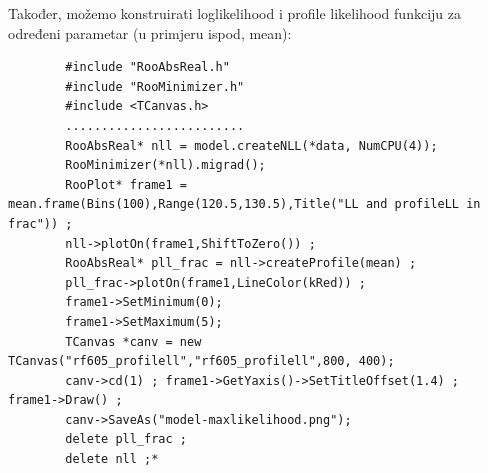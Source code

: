 \documentclass[12pt,a4paper,oneside]{article}
\begin{document}
\begin{linenumbers}
		
		Također, možemo konstruirati loglikelihood i profile likelihood funkciju za određeni parametar (u primjeru ispod, mean):
		
		\begin{verbatim}
		#include "RooAbsReal.h"
		#include "RooMinimizer.h"
		#include <TCanvas.h>
		.........................
		RooAbsReal* nll = model.createNLL(*data, NumCPU(4));
		RooMinimizer(*nll).migrad();
		RooPlot* frame1 = mean.frame(Bins(100),Range(120.5,130.5),Title("LL and profileLL in frac")) ;
		nll->plotOn(frame1,ShiftToZero()) ;
		RooAbsReal* pll_frac = nll->createProfile(mean) ;
		pll_frac->plotOn(frame1,LineColor(kRed)) ;
		frame1->SetMinimum(0);
		frame1->SetMaximum(5);
		TCanvas *canv = new TCanvas("rf605_profilell","rf605_profilell",800, 400);
		canv->cd(1) ; frame1->GetYaxis()->SetTitleOffset(1.4) ; frame1->Draw() ;
		canv->SaveAs("model-maxlikelihood.png");
		delete pll_frac ;
		delete nll ;*
		\end{verbatim}
		
		
	
		
	\end{linenumbers}
\end{document}
